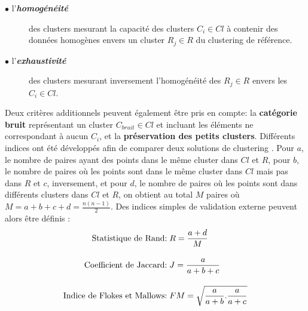 \begin{description}
\item[$\bullet$ l'\textit{\textbf{homogénéité}}] des clusters mesurant la capacité des clusters $C_{i} \in Cl$ à contenir des données homogènes envers un cluster $R_{j} \in R$ du clustering de référence.
\item[$\bullet$ l'\textit{\textbf{exhaustivité}}] des clusters mesurant inversement l'homogénéité des $R_{j} \in R$ envers les $C_{i} \in Cl$.
\end{description}

Deux critères additionnels peuvent également être pris en compte: la \textbf{catégorie bruit} représentant un cluster $C_{bruit} \in Cl$ et incluant les éléments ne correspondant à aucun $C_{i}$, et la \textbf{préservation des petits clusters}. Différents indices ont été développés afin de comparer deux solutions de clustering \citep{gan2007data,rendon2011internal}. Pour $a$, le nombre de paires ayant des points dans le même cluster dans $Cl$ et $R$, pour $b$, le nombre de paires où les points sont dans le même cluster dans $Cl$ mais pas dans $R$ et $c$, inversement, et pour $d$, le nombre de paires où les points sont dans différents clusters dans $Cl$ et $R$, on obtient au total $M$ paires où $M=a+b+c+d=\frac{n(n-1)}{2}$. Des indices simples de validation externe peuvent alors être définis \citep{gan2007data}:\\
\begin{equation}
\begin{split}
\text{Statistique de Rand:\;} & R=\frac{a+d}{M}\\
\\[-0.2cm]
\text{Coefficient de Jaccard:\;}& J=\frac{a}{a+b+c}\\
\\[-0.2cm]
\text{Indice de Flokes et Mallows:\;}& FM=\sqrt{\frac{a}{a+b}.\frac{a}{a+c}}\\
\end{split}
\end{equation}
